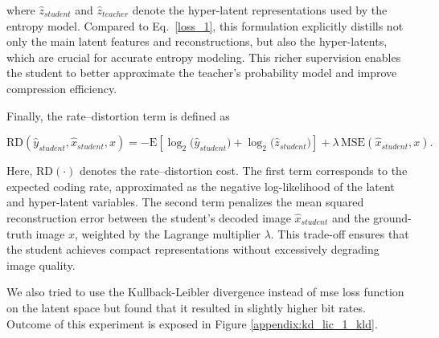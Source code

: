 \documentclass{article}
\begin{document}
where \(\hat{z}_{student}\) and \(\hat{z}_{teacher}\) denote the hyper-latent representations
used by the entropy model. Compared to Eq.~\eqref{loss_1}, this formulation explicitly
distills not only the main latent features and reconstructions, but also the hyper-latents,
which are crucial for accurate entropy modeling. This richer supervision enables the
student to better approximate the teacher’s probability model and improve compression
efficiency.

\medskip
Finally, the rate–distortion term is defined as

\begin{equation}
    \mathrm{RD}(\hat{y}_{student}, \hat{x}_{student}, x) =
    -\mathrm{E}\!\left[\log_{2}\big(\hat{y}_{student}\big) + \log_{2}\big(\hat{z}_{student}\big)\right]
    + \lambda\,\mathrm{MSE}(\hat{x}_{student}, x).
\end{equation}

Here, \(\mathrm{RD}(\cdot)\) denotes the rate–distortion cost. The first term corresponds
to the expected coding rate, approximated as the negative log-likelihood of the latent
and hyper-latent variables. The second term penalizes the mean squared reconstruction
error between the student’s decoded image \(\hat{x}_{student}\) and the ground-truth
image \(x\), weighted by the Lagrange multiplier \(\lambda\). This trade-off ensures that
the student achieves compact representations without excessively degrading image
quality.

We also tried to use the Kullback-Leibler divergence instead of \acrshort{mse} loss function on the latent space but found that it resulted in slightly higher bit rates. Outcome of this experiment is exposed in Figure \ref{appendix:kd_lic_1_kld}.
\end{document}
